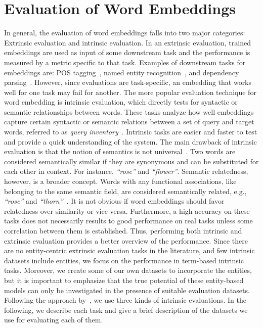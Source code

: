 \section{Evaluation of Word Embeddings}\label{sec:eval_embeddings}
In general, the evaluation of word embeddings falls into two major categories: Extrinsic evaluation and intrinsic evaluation. In an extrinsic evaluation, trained embeddings are used as input of some downstream task and the performance is measured by a metric specific to that task. Examples of downstream tasks for embeddings are: POS tagging~, named entity recognition~, and dependency parsing~. However, since evaluations are task-specific, an embedding that works well for one task may fail for another. The more popular evaluation technique for word embedding is intrinsic evaluation, which directly tests for syntactic or semantic relationships between words. These tasks analyze how well embeddings capture certain syntactic or semantic relations between a set of query and target words, referred to as \textit{query inventory}~. Intrinsic tasks are easier and faster to test and provide a quick understanding of the system. The main drawback of intrinsic evaluation is that the notion of semantics is not universal~. Two words are considered semantically similar if they are synonymous and can be substituted for each other in context. For instance, \emph{``rose''} and \emph{``flower''}. Semantic relatedness, however, is a broader concept. Words with any functional associations, like belonging to the same semantic field, are considered semantically related, e.g., \emph{``rose''} and \emph{``thorn''}~. It is not obvious if word embeddings should favor relatedness over similarity or vice versa. Furthermore, a high accuracy on these tasks does not necessarily results to good performance on real tasks unless some correlation between them is established. Thus, performing both intrinsic and extrinsic evaluation provides a better overview of the performance. Since there are no entity-centric extrinsic evaluation tasks in the literature, and few intrinsic datasets include entities, we focus on the performance in term-based intrinsic tasks. Moreover, we create some of our own datasets to incorporate the entities, but it is important to emphasize that the true potential of these entity-based models can only be investigated in the presence of suitable evaluation datasets. Following the approach by~, we use three kinds of intrinsic evaluations. In the following, we describe each task and give a brief description of the datasets we use for evaluating each of them. 
